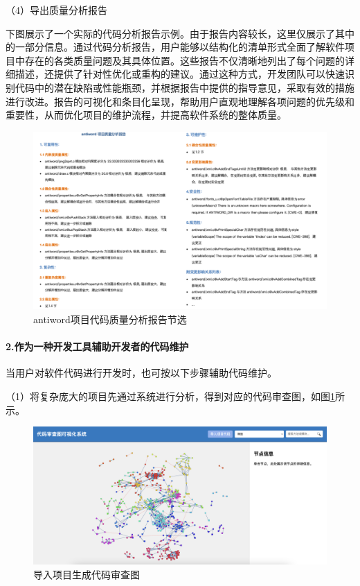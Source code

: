 \noindent（4）导出质量分析报告

下图展示了一个实际的代码分析报告示例。由于报告内容较长，这里仅展示了其中的一部分信息。通过代码分析报告，用户能够以结构化的清单形式全面了解软件项目中存在的各类质量问题及其具体位置。这些报告不仅清晰地列出了每个问题的详细描述，还提供了针对性优化或重构的建议。通过这种方式，开发团队可以快速识别代码中的潜在缺陷或性能瓶颈，并根据报告中提供的指导意见，采取有效的措施进行改进。报告的可视化和条目化呈现，帮助用户直观地理解各项问题的优先级和重要性，从而优化项目的维护流程，并提高软件系统的整体质量。

\clearpage

\begin{figure}[h]
\centering
\includegraphics[width = 1.0\textwidth]{figures/报告.png}
\caption{antiword项目代码质量分析报告节选}
\end{figure}


\paragraph{2.作为一种开发工具辅助开发者的代码维护} 当用户对软件代码进行开发时，也可按以下步骤辅助代码维护。

\noindent（1）将复杂庞大的项目先通过系统进行分析，得到对应的代码审查图，如图\ref{1_导入项目生成代码审查图}所示。

\begin{figure}[h]
\centering
\includegraphics[width = 1.0\textwidth]{figures/开发1.jpg}
\caption{导入项目生成代码审查图}
\label{1_导入项目生成代码审查图}
\end{figure}

